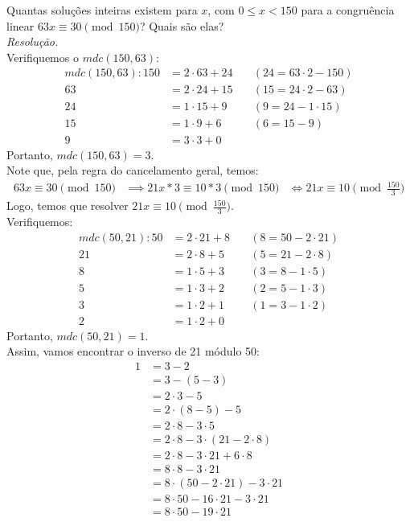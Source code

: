 Quantas soluções inteiras existem para $x$, com $0 \leq x < 150$ para a congruência linear $63x \equiv 30 \pmod{150}$? Quais são elas? \\
\emph{Resolução.} \\
Verifiquemos o $mdc(150, 63)$:
\begin{align*}
mdc(150, 63): 
	150 &= 2 \cdot 63 + 24 &\quad (24 = 63 \cdot 2 - 150) \\
	63 &= 2 \cdot 24 + 15 &\quad (15 = 24 \cdot 2 - 63) \\
	24 &= 1 \cdot 15 + 9 &\quad (9 = 24 - 1 \cdot 15) \\
	15 &= 1 \cdot 9 + 6 &\quad (6 = 15 - 9) \\
	9 &= 3 \cdot 3 + 0 
\end{align*}
Portanto, $mdc(150, 63) = 3$. \\
Note que, pela regra do cancelamento geral, temos:
\begin{align*}
	63x \equiv 30 \pmod{150} &\implies 21x * 3 \equiv 10 * 3 \pmod {150} &\iff 21x \equiv 10 \pmod{\frac{150}{3}}
\end{align*}
Logo, temos que resolver $21x \equiv 10 \pmod{\frac{150}{3}}$. \\
Verifiquemos:
\begin{align*}
mdc(50, 21):
	50 &= 2 \cdot 21 + 8 &\quad (8 = 50 - 2 \cdot 21) \\
	21 &= 2 \cdot 8 + 5 &\quad (5 = 21 - 2 \cdot 8) \\
	8 &= 1 \cdot 5 + 3 &\quad (3 = 8 - 1 \cdot 5) \\
	5 &= 1 \cdot 3 + 2 &\quad (2 = 5 - 1 \cdot 3) \\
	3 &= 1 \cdot 2 + 1 &\quad (1 = 3 - 1 \cdot 2) \\
	2 &= 1 \cdot 2 + 0
\end{align*}
Portanto, $mdc(50, 21) = 1$. \\
Assim, vamos encontrar o inverso de 21 módulo 50: 
\begin{align*}
	1 &= 3 - 2 \\ 
	&= 3 - (5 - 3) \\
	&= 2 \cdot 3 - 5 \\
	&= 2 \cdot (8 - 5) - 5 \\
	&= 2 \cdot 8 - 3 \cdot 5 \\
	&= 2 \cdot 8 - 3 \cdot (21 - 2 \cdot 8) \\
	&= 2 \cdot 8 - 3 \cdot 21 + 6 \cdot 8 \\
	&= 8 \cdot 8 - 3 \cdot 21 \\
	&= 8 \cdot (50 - 2 \cdot 21) - 3 \cdot 21 \\
	&= 8 \cdot 50 - 16 \cdot 21 - 3 \cdot 21 \\
	&= 8 \cdot 50 - 19 \cdot 21
\end{align*}
